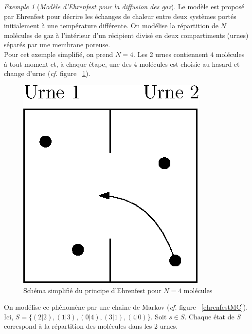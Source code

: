 \documentclass[12pt,a4paper]{report}
\theoremstyle{definition}%
\theoremstyle{remark}
\newtheorem{example}{Exemple}[chapter]
\newcommand{\cf}{\textit{cf.} }
\begin{document}
\begin{example}[\textit{Modèle d'Ehrenfest pour la diffusion des gaz}]
	Le modèle est proposé par Ehrenfest pour décrire les échanges de chaleur entre deux systèmes portés initialement à une température différente. On modélise la répartition de $N$ molécules de gaz à l'intérieur d'un récipient divisé en deux compartiments (urnes) séparés par une membrane poreuse.\\
	Pour cet exemple simplifié, on prend $N = 4$. Les 2 urnes contiennent $4$ molécules à tout moment et, à chaque étape, une des $4$ molécules est choisie au hasard et change d'urne (\cf figure ~\ref{ehrenfestscheme}).
	\begin{figure}[H]
		\centering
		\includegraphics[scale=0.5]{figures/EhrenfestUrne.eps}
		\caption{Schéma simplifié du principe d'Ehrenfest pour $N=4$ molécules}
		\label{ehrenfestscheme}
	\end{figure}
	On modélise ce phénomène par une chaine de Markov (\cf figure ~\ref{ehrenfestMC}). Ici, $S=\{(2|2), (1|3), (0|4), (3|1), (4|0) \}$. Soit $s \in S$.
	Chaque état de $S$ correspond à la répartition des molécules dans les 2 urnes.
	\begin{figure}[H]
		\centering

\end{figure}
\end{example}
\end{document}
